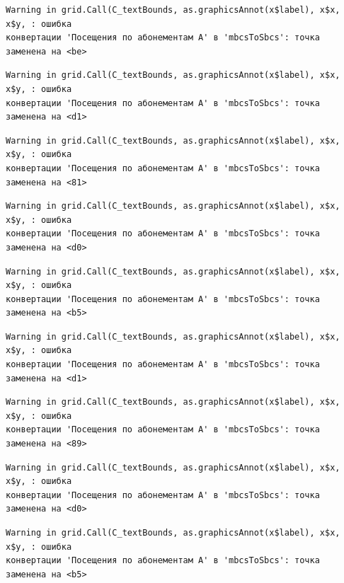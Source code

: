 \documentclass[
  letterpaper,
  DIV=11,
  numbers=noendperiod]{scrreprt}
\begin{document}
\begin{verbatim}
Warning in grid.Call(C_textBounds, as.graphicsAnnot(x$label), x$x, x$y, : ошибка
конвертации 'Посещения по абонементам А' в 'mbcsToSbcs': точка заменена на <be>
\end{verbatim}

\begin{verbatim}
Warning in grid.Call(C_textBounds, as.graphicsAnnot(x$label), x$x, x$y, : ошибка
конвертации 'Посещения по абонементам А' в 'mbcsToSbcs': точка заменена на <d1>
\end{verbatim}

\begin{verbatim}
Warning in grid.Call(C_textBounds, as.graphicsAnnot(x$label), x$x, x$y, : ошибка
конвертации 'Посещения по абонементам А' в 'mbcsToSbcs': точка заменена на <81>
\end{verbatim}

\begin{verbatim}
Warning in grid.Call(C_textBounds, as.graphicsAnnot(x$label), x$x, x$y, : ошибка
конвертации 'Посещения по абонементам А' в 'mbcsToSbcs': точка заменена на <d0>
\end{verbatim}

\begin{verbatim}
Warning in grid.Call(C_textBounds, as.graphicsAnnot(x$label), x$x, x$y, : ошибка
конвертации 'Посещения по абонементам А' в 'mbcsToSbcs': точка заменена на <b5>
\end{verbatim}

\begin{verbatim}
Warning in grid.Call(C_textBounds, as.graphicsAnnot(x$label), x$x, x$y, : ошибка
конвертации 'Посещения по абонементам А' в 'mbcsToSbcs': точка заменена на <d1>
\end{verbatim}

\begin{verbatim}
Warning in grid.Call(C_textBounds, as.graphicsAnnot(x$label), x$x, x$y, : ошибка
конвертации 'Посещения по абонементам А' в 'mbcsToSbcs': точка заменена на <89>
\end{verbatim}

\begin{verbatim}
Warning in grid.Call(C_textBounds, as.graphicsAnnot(x$label), x$x, x$y, : ошибка
конвертации 'Посещения по абонементам А' в 'mbcsToSbcs': точка заменена на <d0>
\end{verbatim}

\begin{verbatim}
Warning in grid.Call(C_textBounds, as.graphicsAnnot(x$label), x$x, x$y, : ошибка
конвертации 'Посещения по абонементам А' в 'mbcsToSbcs': точка заменена на <b5>
\end{verbatim}
\end{document}
